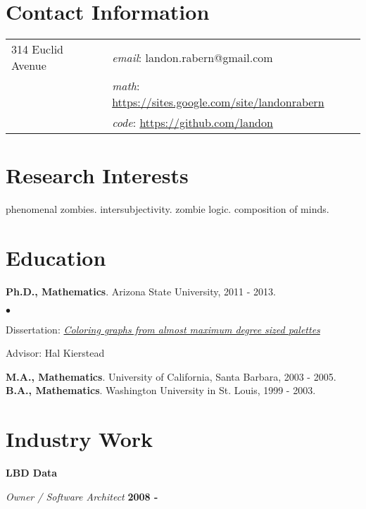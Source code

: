 \documentclass[margin,line]{res}
\newenvironment{list2}{
  \begin{list}{$\bullet$}{%
      \setlength{\itemsep}{0in}
      \setlength{\parsep}{0in} \setlength{\parskip}{0in}
      \setlength{\topsep}{0in} \setlength{\partopsep}{0in} 
      \setlength{\leftmargin}{0.2in}}}{\end{list}}
\begin{document}

\begin{resume}
\section{\sc Contact Information}
\vspace{.05in}
\begin{tabular}{@{}p{2in}p{4in}}     
314 Euclid Avenue & \qquad\qquad\textit{email}: landon.rabern@gmail.com \\   
 & \qquad\qquad \textit{math}: \url{https://sites.google.com/site/landonrabern} \\
& \qquad\qquad \textit{code}: \href{https://github.com/landon?tab=repositories}{https://github.com/landon}
\end{tabular}

\section{\sc Research Interests}
phenomenal zombies.  intersubjectivity.  zombie logic.  composition of minds.


\bigskip

\section{\sc Education}
{\bf Ph.D., Mathematics}. Arizona State University, 2011 - 2013.
\begin{list2}
\item Dissertation: \textit{\href{https://dl.dropbox.com/u/8609833/Papers/main_fancy.pdf}{Coloring graphs from almost maximum degree sized palettes}}
\item Advisor: Hal Kierstead
\end{list2}
{\bf M.A., Mathematics}. University of California, Santa Barbara, 2003 - 2005.\\
{\bf  B.A., Mathematics}. Washington University in St. Louis, 1999 - 2003.

\section{\sc Industry Work}

{\bf LBD Data}

\vspace{-.4cm}
{\em Owner / Software Architect} \hfill {\bf 2008 - \phantom{2017}}


\end{resume}
\end{document}
